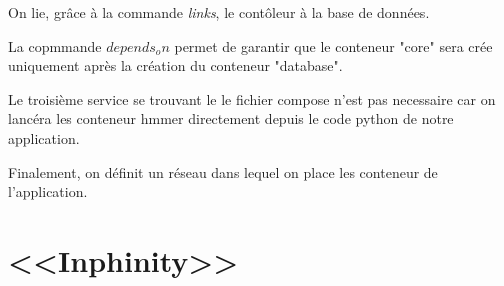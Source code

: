 On lie, grâce à la commande \emph{links}, le contôleur à la base de données.

La copmmande \emph{$depends_on$} permet de garantir que le conteneur "core" sera crée uniquement après la création du conteneur "database".

Le troisième service se trouvant le le fichier compose n'est pas necessaire car on lancéra les conteneur hmmer directement depuis le code python de notre application. 

Finalement, on définit un réseau dans lequel on place les conteneur de l'application.

\section{<<Inphinity>>}

















